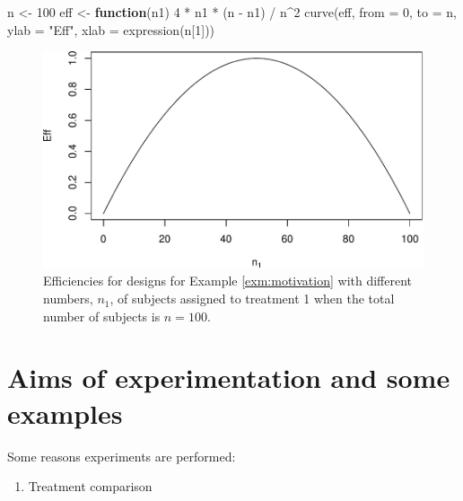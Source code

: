 \documentclass[
]{book}
\newenvironment{Shaded}{\begin{snugshade}}{\end{snugshade}}
\newcommand{\AttributeTok}[1]{\textcolor[rgb]{0.77,0.63,0.00}{#1}}
\newcommand{\ControlFlowTok}[1]{\textcolor[rgb]{0.13,0.29,0.53}{\textbf{#1}}}
\newcommand{\DecValTok}[1]{\textcolor[rgb]{0.00,0.00,0.81}{#1}}
\newcommand{\FunctionTok}[1]{\textcolor[rgb]{0.00,0.00,0.00}{#1}}
\newcommand{\NormalTok}[1]{#1}
\newcommand{\OtherTok}[1]{\textcolor[rgb]{0.56,0.35,0.01}{#1}}
\newcommand{\SpecialCharTok}[1]{\textcolor[rgb]{0.00,0.00,0.00}{#1}}
\newcommand{\StringTok}[1]{\textcolor[rgb]{0.31,0.60,0.02}{#1}}
\providecommand{\tightlist}{%
  \setlength{\itemsep}{0pt}\setlength{\parskip}{0pt}}
\theoremstyle{definition}
\theoremstyle{definition}
\theoremstyle{definition}
\theoremstyle{definition}
\theoremstyle{remark}
\begin{document}
\begin{Shaded}
\begin{Highlighting}[]
\NormalTok{n }\OtherTok{\textless{}{-}} \DecValTok{100} 
\NormalTok{eff }\OtherTok{\textless{}{-}} \ControlFlowTok{function}\NormalTok{(n1) }\DecValTok{4} \SpecialCharTok{*}\NormalTok{ n1 }\SpecialCharTok{*}\NormalTok{ (n }\SpecialCharTok{{-}}\NormalTok{ n1) }\SpecialCharTok{/}\NormalTok{ n}\SpecialCharTok{\^{}}\DecValTok{2}
\FunctionTok{curve}\NormalTok{(eff, }\AttributeTok{from =} \DecValTok{0}\NormalTok{, }\AttributeTok{to =}\NormalTok{ n, }\AttributeTok{ylab =} \StringTok{"Eff"}\NormalTok{, }\AttributeTok{xlab =} \FunctionTok{expression}\NormalTok{(n[}\DecValTok{1}\NormalTok{]))}
\end{Highlighting}
\end{Shaded}

\begin{figure}
\centering
\includegraphics{bookdown_math3014-6027_files/figure-latex/simple-efficiency-1.pdf}
\caption{\label{fig:simple-efficiency}Efficiencies for designs for Example \ref{exm:motivation} with different numbers, \(n_1\), of subjects assigned to treatment 1 when the total number of subjects is \(n=100\).}
\end{figure}

\hypertarget{aims-of-experimentation-and-some-examples}{%
\section{Aims of experimentation and some examples}\label{aims-of-experimentation-and-some-examples}}

Some reasons experiments are performed:

\begin{enumerate}
\def\labelenumi{\arabic{enumi}.}
\tightlist
\item
  Treatment comparison
\end{enumerate}
\end{document}
